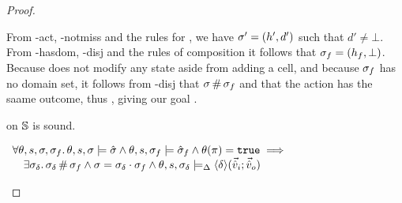 \begin{proof}
\pfcase{$\alpha=\alloc$}

\begin{hypvlist}
 From \hyp{act}, \hyp{notmiss} and the rules for \alloc{}, we have $\sigma'=(h',d')$ such that $d'\neq\bot$.
 From \hyp{hasdom}, \hyp{disj} and the rules of composition it follows that $\sigma_f=(h_f,\bot)$.
 Because \alloc{} does not modify any state aside from adding a cell, and because $\sigma_f$ has no domain set, it follows from \hyp{disj} that $\sigma\operatorname{\#}\sigma_f$ and that the action has the saame outcome, thus , giving our goal .
\end{hypvlist}


\pfassume \begin{hypvlist}
 
 \consume{} on $\mathbb S$ is sound.
\end{hypvlist}
\pfprove \begin{goalvlist}
 $\begin{array}{l}
\forall \theta,s,\sigma,\sigma_f\ldotp \theta,s,\sigma\models \hat{\sigma} \land \theta,s,\sigma_f\models \hat{\sigma}_f \land \theta(\pi)=\texttt{true} \implies \\
\quad \exists \sigma_\delta\ldotp \sigma_\delta\operatorname{\#}\sigma_f \land \sigma=\sigma_\delta\cdot\sigma_f \land \theta, s, \sigma_\delta \models_{\Delta} \left<\delta\right>\!(\vec{\hat{v}}_i;\vec{\hat{v}}_o)
\end{array}$
\end{goalvlist}

\pfcase{$\delta \in \preds_\mmdl$}


\end{proof}
